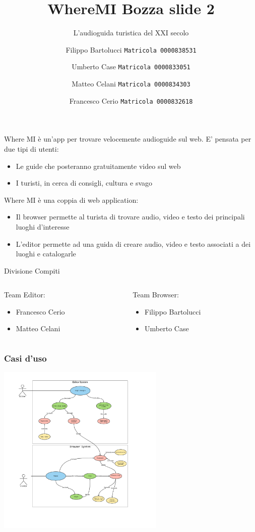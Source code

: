\documentclass{beamer}
\title{WhereMI Bozza slide 2}
\subtitle{L'audioguida turistica del XXI secolo}
\author{
  Filippo Bartolucci
  \texttt{Matricola 0000838531}\\
  \and
  Umberto Case
  \texttt{Matricola 0000833051}\\
    \and
  Matteo Celani
  \texttt{Matricola 0000834303}\\
    \and
  Francesco Cerio
  \texttt{Matricola 0000832618}
 }
\institute{Università di Bologna}
\date{}
\begin{document}
\begin{frame}
\titlepage
\end{frame}

\begin{frame}
Where MI è un'app per trovare velocemente audioguide sul web. E' pensata per due tipi di utenti:
\begin{itemize}
  \item Le guide che posteranno gratuitamente video sul web
  \item I turisti, in cerca di consigli, cultura e svago
\end{itemize}
Where MI è una coppia di web application:
\begin{itemize}
  \item Il browser permette al turista di trovare audio, video e testo dei principali luoghi d'interesse
  \item L'editor permette ad una guida di creare audio, video e testo associati a dei luoghi e catalogarle
\end{itemize}
\vspace{0.2cm}
\centering Divisione Compiti
\vspace{0.2cm}
  \begin{columns}
    \begin{column}{.48\textwidth} %
    Team Editor:
 \begin{itemize}
  \item Francesco Cerio
  \item Matteo Celani
\end{itemize}
    \end{column}
    \hfill
    \begin{column}{.48 \textwidth}
    Team Browser:
  \begin{itemize}
  \item Filippo Bartolucci
  \item Umberto Case
\end{itemize}
    \end{column}
  \end{columns}
\end{frame}

\begin{frame}
\frametitle{Casi d'uso}
	\centering \includegraphics[width=8cm]{Images/UML/UML3.png}
\end{frame}
\end{document}
